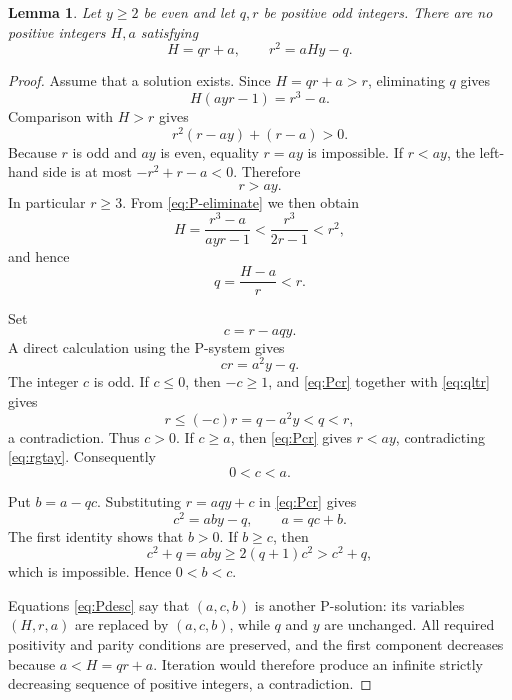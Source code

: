 \documentclass[11pt]{amsart}
\newtheorem{lemma}[theorem]{Lemma}
\theoremstyle{remark}
\begin{document}
\begin{lemma}\label{lem:P}
Let $y\ge2$ be even and let $q,r$ be positive odd integers.  There are
no positive integers $H,a$ satisfying
\[
 H=qr+a,
 \qquad
 r^2=aHy-q.
\]
\end{lemma}

\begin{proof}
Assume that a solution exists.  Since $H=qr+a>r$, eliminating $q$
gives
\begin{equation}\label{eq:P-eliminate}
 H(ayr-1)=r^3-a.
\end{equation}
Comparison with $H>r$ gives
\[
 r^2(r-ay)+(r-a)>0.
\]
Because $r$ is odd and $ay$ is even, equality $r=ay$ is impossible.
If $r<ay$, the left-hand side is at most $-r^2+r-a<0$.
Therefore
\begin{equation}\label{eq:rgtay}
 r>ay.
\end{equation}
In particular $r\ge3$.  From \eqref{eq:P-eliminate} we then obtain
\[
 H=\frac{r^3-a}{ayr-1}
   <\frac{r^3}{2r-1}
   <r^2,
\]
and hence
\begin{equation}\label{eq:qltr}
 q=\frac{H-a}{r}<r.
\end{equation}

Set
\[
 c=r-aqy.
\]
A direct calculation using the P-system gives
\begin{equation}\label{eq:Pcr}
 cr=a^2y-q.
\end{equation}
The integer $c$ is odd.  If $c\le0$, then $-c\ge1$, and
\eqref{eq:Pcr} together with \eqref{eq:qltr} gives
\[
 r\le(-c)r=q-a^2y<q<r,
\]
a contradiction.  Thus $c>0$.  If $c\ge a$, then
\eqref{eq:Pcr} gives $r<ay$, contradicting \eqref{eq:rgtay}.
Consequently
\begin{equation}\label{eq:P-c-range}
 0<c<a.
\end{equation}

Put $b=a-qc$.  Substituting $r=aqy+c$ in \eqref{eq:Pcr} gives
\begin{equation}\label{eq:Pdesc}
 c^2=aby-q,
 \qquad
 a=qc+b.
\end{equation}
The first identity shows that $b>0$.  If $b\ge c$, then
\[
 c^2+q=aby\ge2(q+1)c^2>c^2+q,
\]
which is impossible.  Hence $0<b<c$.

Equations \eqref{eq:Pdesc} say that $(a,c,b)$ is another P-solution:
its variables $(H,r,a)$ are replaced by $(a,c,b)$, while $q$ and $y$
are unchanged.  All required positivity and parity conditions are
preserved, and the first component decreases because $a<H=qr+a$.
Iteration would therefore produce an infinite strictly decreasing
sequence of positive integers, a contradiction.
\end{proof}
\end{document}
